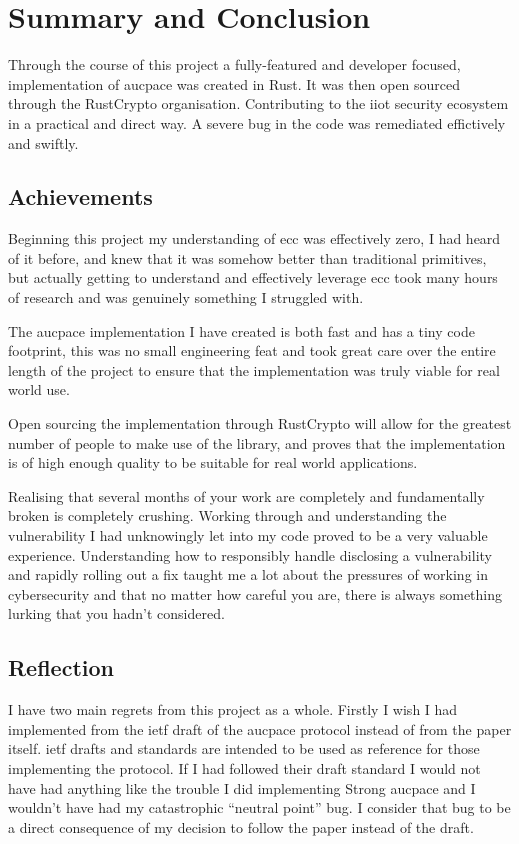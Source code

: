 \chapter{Summary and Conclusion}
\label{chap:conclusion}

Through the course of this project a fully-featured and developer focused, implementation of \gls{aucpace} was created in Rust.
It was then open sourced through the RustCrypto organisation.
Contributing to the \gls{iiot} security ecosystem in a practical and direct way.
A severe bug in the code was remediated effictively and swiftly.

\section{Achievements}
Beginning this project my understanding of \gls{ecc} was effectively zero, I had heard of it before, and knew that it was somehow better than traditional primitives, but actually getting to understand and effectively leverage \gls{ecc} took many hours of research and was genuinely something I struggled with.

The \gls{aucpace} implementation I have created is both fast and has a tiny code footprint, this was no small engineering feat and took great care over the entire length of the project to ensure that the implementation was truly viable for real world use.

Open sourcing the implementation through RustCrypto will allow for the greatest number of people to make use of the library, and proves that the implementation is of high enough quality to be suitable for real world applications.

Realising that several months of your work are completely and fundamentally broken is completely crushing.
Working through and understanding the vulnerability I had unknowingly let into my code proved to be a very valuable experience.
Understanding how to responsibly handle disclosing a vulnerability and rapidly rolling out a fix taught me a lot about the pressures of working in cybersecurity and that no matter how careful you are, there is always something lurking that you hadn't considered.

\section{Reflection}
I have two main regrets from this project as a whole.
Firstly I wish I had implemented from the \gls{ietf} draft of the \gls{aucpace} protocol instead of from the paper itself.
\gls{ietf} drafts and standards are intended to be used as reference for those implementing the protocol.
If I had followed their draft standard I would not have had anything like the trouble I did implementing Strong \gls{aucpace} and I wouldn't have had my catastrophic \enquote{neutral point} bug.
I consider that bug to be a direct consequence of my decision to follow the paper instead of the draft.


